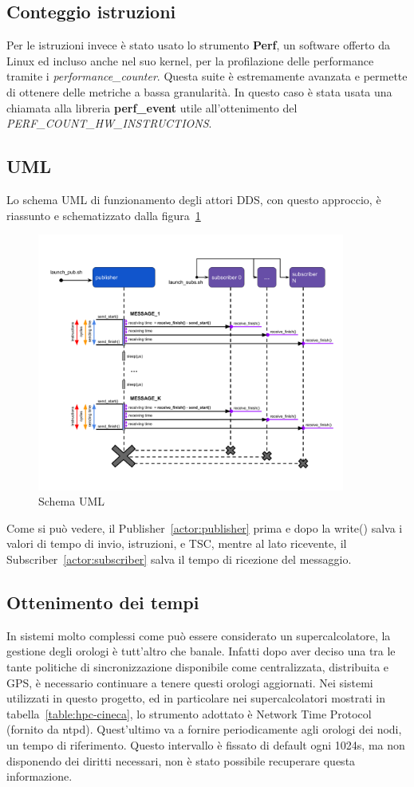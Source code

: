 \subsection{Conteggio istruzioni}
Per le istruzioni invece è stato usato lo strumento \textbf{Perf}, un software offerto da Linux ed incluso anche nel suo kernel, per la profilazione delle performance tramite i \emph{performance\_counter}. Questa suite è estremamente avanzata e permette di ottenere delle metriche a bassa granularità. In questo caso è stata usata una chiamata alla libreria \textbf{perf\_event} utile all'ottenimento del \emph{PERF\_COUNT\_HW\_INSTRUCTIONS}.
\subsection{UML}
Lo schema UML di funzionamento degli attori DDS, con questo approccio, è riassunto e schematizzato dalla figura~\ref{fig:uml}
\begin{figure}[H]
    \centering
    \includegraphics[width=0.9\textwidth]{./img/umel-send-receive.png}
    \caption{Schema UML}\label{fig:uml}
\end{figure}
Come si può vedere, il Publisher~\ref{actor:publisher} prima e dopo la write() salva i valori di tempo di invio, istruzioni, e TSC, mentre al lato ricevente, il Subscriber~\ref{actor:subscriber} salva il tempo di ricezione del messaggio.
\subsection{Ottenimento dei tempi}
In sistemi molto complessi come può essere considerato un supercalcolatore, la gestione degli orologi è tutt'altro che banale. Infatti dopo aver deciso una tra le tante politiche di sincronizzazione disponibile come centralizzata, distribuita e GPS, è necessario continuare a tenere questi orologi aggiornati. Nei sistemi utilizzati in questo progetto, ed in particolare nei supercalcolatori mostrati in tabella~\ref{table:hpc-cineca}, lo strumento adottato è Network Time Protocol (fornito da ntpd). 
Quest'ultimo va a fornire periodicamente agli orologi dei nodi, un tempo di riferimento. Questo intervallo è fissato di default ogni 1024s, ma non disponendo dei diritti necessari, non è stato possibile recuperare questa informazione.

